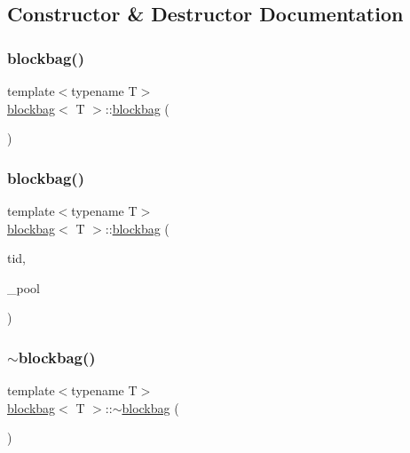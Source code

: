 \subsection{Constructor \& Destructor Documentation}
\mbox{\label{classblockbag_ad9443345e870e2faf375d14e1600918f}} 
\subsubsection{\texorpdfstring{blockbag()}{blockbag()}\hspace{0.1cm}{\footnotesize\ttfamily [1/2]}}
{\footnotesize\ttfamily template$<$typename T$>$ \\
\hyperlink{classblockbag}{blockbag}$<$ T $>$\+::\hyperlink{classblockbag}{blockbag} (\begin{DoxyParamCaption}{ }\end{DoxyParamCaption})\hspace{0.3cm}{\ttfamily [inline]}}

\mbox{\label{classblockbag_a2b387e4ba02e7c1dc9bbba8056a78ab3}} 
\subsubsection{\texorpdfstring{blockbag()}{blockbag()}\hspace{0.1cm}{\footnotesize\ttfamily [2/2]}}
{\footnotesize\ttfamily template$<$typename T$>$ \\
\hyperlink{classblockbag}{blockbag}$<$ T $>$\+::\hyperlink{classblockbag}{blockbag} (\begin{DoxyParamCaption}\item[{const int}]{tid,  }\item[{\hyperlink{classblockpool}{blockpool}$<$ T $>$ $\ast$const}]{\+\_\+pool }\end{DoxyParamCaption})\hspace{0.3cm}{\ttfamily [inline]}}

\mbox{\label{classblockbag_a9353b0797054b55ab1032912718c25ee}} 
\subsubsection{\texorpdfstring{$\sim$blockbag()}{~blockbag()}}
{\footnotesize\ttfamily template$<$typename T$>$ \\
\hyperlink{classblockbag}{blockbag}$<$ T $>$\+::$\sim$\hyperlink{classblockbag}{blockbag} (\begin{DoxyParamCaption}{ }\end{DoxyParamCaption})\hspace{0.3cm}{\ttfamily [inline]}}



